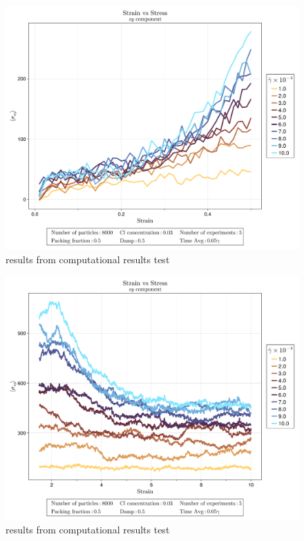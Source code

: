 \begin{figure}[ht!]
    \centering
    \includegraphics[width=\textwidth]{figs/ComputaitonalResults/CL3/ElasticStrainStressXY.png}
    \caption{results from computational results test}
\end{figure}

\begin{figure}[ht!]
    \centering
    \includegraphics[width=\textwidth]{figs/ComputaitonalResults/CL3/ViscoElasticStrainStressXY.png}
    \caption{results from computational results test}
\end{figure}


